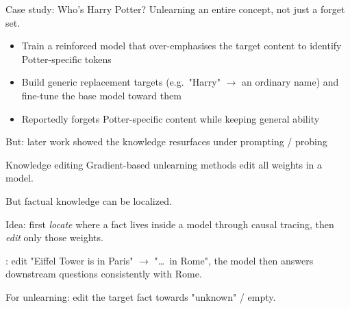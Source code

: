 \documentclass[12pt,aspectratio=169,handout]{beamer}
\begin{document}
\begin{frame}{Case study: Who's Harry Potter?}
Unlearning an entire \alert{concept}, not just a forget set.
\begin{itemize}
    \item Train a \alert{reinforced model} that over-emphasises the target
          content to identify Potter-specific tokens
    \item Build \alert{generic replacement targets} (e.g.\ "Harry" $\to$ an
          ordinary name) and fine-tune the base model toward them
    \item Reportedly forgets Potter-specific content while keeping general ability
\end{itemize}
\alert{But:} later work showed the knowledge \alert{resurfaces} under
prompting / probing

\end{frame}

\begin{frame}{Knowledge editing}
Gradient-based unlearning methods edit all weights in a model.


But factual knowledge can be localized.


\alert{Idea:} first \emph{locate} where a fact lives inside a model through causal tracing, then \emph{edit} only those weights.   


\citet{meng2022locating}: edit "Eiffel Tower is in Paris" $\to$ "\dots\ in Rome", the model then answers downstream questions consistently with Rome.


\alert{For unlearning:} edit the target fact towards "unknown" / empty.


\end{frame}
\end{document}
